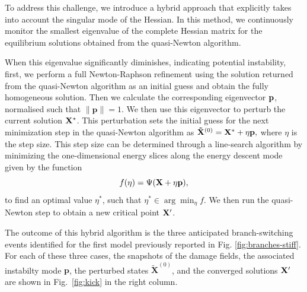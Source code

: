 To address this challenge, we introduce a hybrid approach {that explicitly takes into account the singular mode of the Hessian}. In this method, we continuously monitor the smallest eigenvalue of the complete {Hessian} matrix for the equilibrium solutions obtained from the quasi-Newton algorithm.

When this eigenvalue significantly diminishes, indicating potential instability, first, we perform a full Newton-Raphson refinement using the solution returned from the quasi-Newton algorithm as an initial guess and obtain the fully homogeneous solution. Then we calculate the corresponding eigenvector \(\mathbf{p}\), normalised such that $\|\textbf{p}\|=1$.
We then use this eigenvector to perturb the current solution $\mathbf{X^*}$. This perturbation sets the initial guess for the next minimization step in the quasi-Newton algorithm as $\mathbf{\tilde X}^{(0)} = \mathbf{X^*} + \eta \mathbf{p},
$ where \(\eta\) is the step size.
This step size can be determined through a line-search algorithm by minimizing the one-dimensional energy slices along the energy descent mode given by the function
\begin{equation}
    f(\eta) = \Psi(\mathbf{X} + \eta \mathbf{p}),
    \label{eqn:energy-slice}
\end{equation}
to find an optimal value \(\eta^*\), such that $\eta^* \in \arg \min_{\eta} f$. {We then run the quasi-Newton step to obtain a new critical point $\mathbf{X}'$.}

The outcome of this hybrid algorithm is the three anticipated branch-switching events identified for the first model previously reported in Fig. \ref{fig:branches-stiff}. For each of these three cases, the snapshots of the damage fields, the associated {instabilty mode} \(\mathbf{p}\), the perturbed states \(\mathbf{\tilde X}^{(0)}\), and the converged solutions $\mathbf{X}'$ are shown in Fig.~\ref{fig:kick} in the right column.

